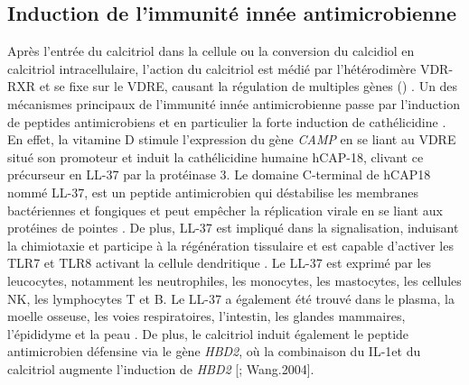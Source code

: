 \documentclass[
  a4paper,
  DIV=11,
  numbers=noendperiod,
  listof=totoc]{scrreprt}
\begin{document}
\subsection{Induction de l'immunité innée
antimicrobienne}\label{induction-de-limmunituxe9-innuxe9e-antimicrobienne}

Après l'entrée du calcitriol dans la cellule ou la conversion du
calcidiol en calcitriol intracellulaire, l'action du calcitriol est
médié par l'hétérodimère \ac{VDR}-\ac{RXR} et se fixe sur le \ac{VDRE},
causant la régulation de multiples gènes
() \autocite{Caprio.2017,Yasmin.2005}. Un
des mécanismes principaux de l'immunité innée antimicrobienne passe par
l'induction de peptides antimicrobiens et en particulier la forte
induction de cathélicidine \autocite{Wang.2004}. En effet, la vitamine D
stimule l'expression du gène \emph{CAMP} en se liant au \ac{VDRE} situé
son promoteur et induit la cathélicidine humaine hCAP-18, clivant ce
précurseur en LL-37 par la protéinase 3. Le domaine C-terminal de hCAP18
nommé LL-37, est un peptide antimicrobien qui déstabilise les membranes
bactériennes et fongiques et peut empêcher la réplication virale en se
liant aux protéines de pointes \autocite{Bishop.2021,Charoenngam.2020}.
De plus, LL-37 est impliqué dans la signalisation, induisant la
chimiotaxie et participe à la régénération tissulaire et est capable
d'activer les TLR7 et TLR8 activant la cellule dendritique
\autocite{Silva.2012}. Le LL-37 est exprimé par les leucocytes,
notamment les neutrophiles, les monocytes, les mastocytes, les cellules
NK, les lymphocytes T et B. Le LL-37 a également été trouvé dans le
plasma, la moelle osseuse, les voies respiratoires, l'intestin, les
glandes mammaires, l'épididyme et la peau \autocite{Silva.2012}. De
plus, le calcitriol induit également le peptide antimicrobien défensine
 via le gène \emph{HBD2}, où la combinaison du IL-1\mupbeta et
du calcitriol augmente l'induction de \emph{HBD2}
{[}\textcite{Bishop.2021}; Wang.2004{]}.
\end{document}
